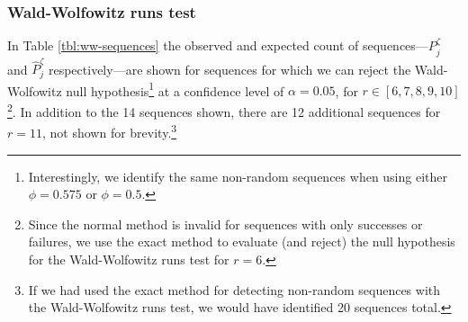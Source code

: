 \documentclass{article}
\begin{document}
\hypertarget{wald-wolfowitz-runs-test-1}{%
\subsubsection{Wald-Wolfowitz runs
test}\label{wald-wolfowitz-runs-test-1}}

In Table \ref{tbl:ww-sequences} the observed and expected count of
sequences---\(P^{\zeta}_j\) and \(\hat{P}^{\zeta}_j\) respectively---are
shown for sequences for which we can reject the Wald-Wolfowitz null
hypothesis\footnote{Interestingly, we identify the same non-random
  sequences when using either \(\phi = 0.575\) or \(\phi = 0.5\).} at a
confidence level of \(\alpha = 0.05\), for
\(r \in [6, 7, 8, 9, 10]\)\footnote{Since the normal method is invalid
  for sequences with only successes or failures, we use the exact method
  to evaluate (and reject) the null hypothesis for the Wald-Wolfowitz
  runs test for \(r = 6\).}. In addition to the 14 sequences shown,
there are 12 additional sequences for \(r = 11\), not shown for
brevity.\footnote{If we had used the exact method for detecting
  non-random sequences with the Wald-Wolfowitz runs test, we would have
  identified 20 sequences total.}
\end{document}
